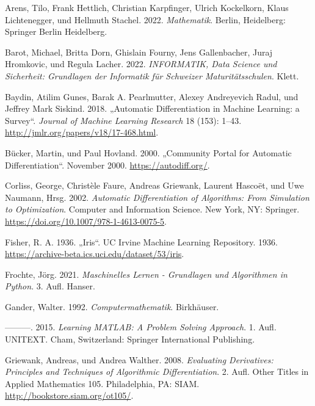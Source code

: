 \documentclass[
  a4paper,
  DIV=11]{scrreprt}
\newlength{\cslhangindent}
\newlength{\cslentryspacingunit} %
\newenvironment{CSLReferences}[2] %
 {%
  \setlength{\parindent}{0pt}
  \ifodd #1
  \let\oldpar\par
  \def\par{\hangindent=\cslhangindent\oldpar}
  \fi
  \setlength{\parskip}{#2\cslentryspacingunit}
 }%
 {}
\theoremstyle{definition}
\theoremstyle{definition}
\theoremstyle{remark}
\begin{document}
\hypertarget{refs}{}
\begin{CSLReferences}{1}{0}
\leavevmode{}%
Arens, Tilo, Frank Hettlich, Christian Karpfinger, Ulrich Kockelkorn,
Klaus Lichtenegger, und Hellmuth Stachel. 2022. \emph{Mathematik}.
Berlin, Heidelberg: Springer Berlin Heidelberg.

\leavevmode{}%
Barot, Michael, Britta Dorn, Ghislain Fourny, Jens Gallenbacher, Juraj
Hromkovic, und Regula Lacher. 2022. \emph{{INFORMATIK}, Data Science und
Sicherheit: Grundlagen der Informatik f{ü}r Schweizer
Maturit{ä}tsschulen}. Klett.

\leavevmode{}%
Baydin, Atilim Gunes, Barak A. Pearlmutter, Alexey Andreyevich Radul,
und Jeffrey Mark Siskind. 2018. {„Automatic Differentiation in Machine
Learning: a Survey``}. \emph{Journal of Machine Learning Research} 18
(153): 1--43. \url{http://jmlr.org/papers/v18/17-468.html}.

\leavevmode{}%
Bücker, Martin, und Paul Hovland. 2000. {„Community Portal for Automatic
Differentiation``}. November 2000. \url{https://autodiff.org/}.

\leavevmode{}%
Corliss, George, Christèle Faure, Andreas Griewank, Laurent Hascoët, und
Uwe Naumann, Hrsg. 2002. \emph{Automatic Differentiation of Algorithms:
From Simulation to Optimization}. Computer and Information Science. New
York, NY: Springer. \url{https://doi.org/10.1007/978-1-4613-0075-5}.

\leavevmode{}%
Fisher, R. A. 1936. {„Iris``}. UC Irvine Machine Learning Repository.
1936. \url{https://archive-beta.ics.uci.edu/dataset/53/iris}.

\leavevmode{}%
Frochte, Jörg. 2021. \emph{Maschinelles Lernen - Grundlagen und
Algorithmen in Python}. 3. Aufl. Hanser.

\leavevmode{}%
Gander, Walter. 1992. \emph{Computermathematik}. Birkhäuser.

\leavevmode{}%
---------. 2015. \emph{Learning {MATLAB}: A Problem Solving Approach}.
1. Aufl. UNITEXT. Cham, Switzerland: Springer International Publishing.

\leavevmode{}%
Griewank, Andreas, und Andrea Walther. 2008. \emph{Evaluating
Derivatives: {P}rinciples and Techniques of Algorithmic
Differentiation}. 2. Aufl. Other Titles in Applied Mathematics 105.
Philadelphia, PA: SIAM. \url{http://bookstore.siam.org/ot105/}.


\end{CSLReferences}
\end{document}
